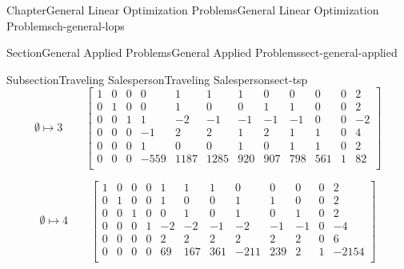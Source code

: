 \documentclass[oneside,10pt,]{book}
\numberwithin{equation}{section}
\newcommand{\amp}{&}
\begin{document}
\begin{chapterptx}{Chapter}{General Linear Optimization Problems}{}{General Linear Optimization Problems}{}{}{ch-general-lops}
\begin{sectionptx}{Section}{General Applied Problems}{}{General Applied Problems}{}{}{sect-general-applied}
\begin{subsectionptx}{Subsection}{Traveling Salesperson}{}{Traveling Salesperson}{}{}{sect-tsp}
\begin{equation*}
\emptyset \mapsto 3 \qquad \left[\begin{array}{rrrrr|rrrrrr|r} 1 \amp 0 \amp 0 \amp 0 \amp 1 \amp 1 \amp 1 \amp 0 \amp 0 \amp 0 \amp 0 \amp 2\\ 0 \amp 1 \amp 0 \amp 0 \amp 1 \amp 0 \amp 0 \amp 1 \amp 1 \amp 0 \amp 0 \amp 2\\ 0 \amp 0 \amp 1 \amp 1 \amp -2 \amp -1 \amp -1 \amp -1 \amp -1 \amp 0 \amp 0 \amp -2\\ 0 \amp 0 \amp 0 \amp -1 \amp 2 \amp 2 \amp 1 \amp 2 \amp 1 \amp 1 \amp 0 \amp 4\\ 0 \amp 0 \amp 0 \amp 1 \amp 0 \amp 0 \amp 1 \amp 0 \amp 1 \amp 1 \amp 0 \amp 2\\ \hline 0 \amp 0 \amp 0 \amp -559 \amp 1187 \amp 1285 \amp 920 \amp 907 \amp 798 \amp 561 \amp 1 \amp 82\\ \end{array} \right]
\end{equation*}
%
\par
%
\begin{equation*}
\emptyset \mapsto 4 \qquad \left[\begin{array}{rrrrr|rrrrrr|r} 1 \amp 0 \amp 0 \amp 0 \amp 1 \amp 1 \amp 1 \amp 0 \amp 0 \amp 0 \amp 0 \amp 2\\ 0 \amp 1 \amp 0 \amp 0 \amp 1 \amp 0 \amp 0 \amp 1 \amp 1 \amp 0 \amp 0 \amp 2\\ 0 \amp 0 \amp 1 \amp 0 \amp 0 \amp 1 \amp 0 \amp 1 \amp 0 \amp 1 \amp 0 \amp 2\\ 0 \amp 0 \amp 0 \amp 1 \amp -2 \amp -2 \amp -1 \amp -2 \amp -1 \amp -1 \amp 0 \amp -4\\ 0 \amp 0 \amp 0 \amp 0 \amp 2 \amp 2 \amp 2 \amp 2 \amp 2 \amp 2 \amp 0 \amp 6\\ \hline 0 \amp 0 \amp 0 \amp 0 \amp 69 \amp 167 \amp 361 \amp -211 \amp 239 \amp 2 \amp 1 \amp -2154\\ \end{array} \right]
\end{equation*}
%
\par
%
\begin{equation*}

\end{equation*}
\end{subsectionptx}
\end{sectionptx}
\end{chapterptx}
\end{document}
